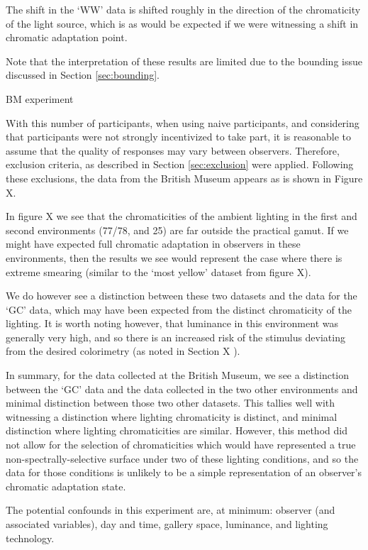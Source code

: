 The shift in the `WW' data is shifted roughly in the direction of the chromaticity of the light source, which is as would be expected if we were witnessing a shift in chromatic adaptation point.

Note that the interpretation of these results are limited due to the bounding issue discussed in Section \ref{sec:bounding}.

BM experiment


With this number of participants, when using naive participants, and considering that participants were not strongly incentivized to take part, it is reasonable to assume that the quality of responses may vary between observers. Therefore, exclusion criteria, as described in Section \ref{sec:exclusion} were applied. Following these exclusions, the data from the British Museum appears as is shown in Figure X. 

In figure X we see that the chromaticities of the ambient lighting in the first and second environments (77/78, and 25) are far outside the practical gamut. If we might have expected full chromatic adaptation in observers in these environments, then the results we see would represent the case where there is extreme smearing (similar to the `most yellow' dataset from figure X). 

We do however see a distinction between these two datasets and the data for the `GC' data, which may have been expected from the distinct chromaticity of the lighting. It is worth noting however, that luminance in this environment was generally very high, and so there is an increased risk of the stimulus deviating from the desired colorimetry (as noted in Section X%
).

In summary, for the data collected at the British Museum, we see a distinction between the `GC' data and the data collected in the two other environments and minimal distinction between those two other datasets. This tallies well with witnessing a distinction where lighting chromaticity is distinct, and minimal distinction where lighting chromaticities are similar. However, this method did not allow for the selection of chromaticities which would have represented a true non-spectrally-selective surface under two of these lighting conditions, and so the data for those conditions is unlikely to be a simple representation of an observer's chromatic adaptation state.

The potential confounds in this experiment are, at minimum: observer (and associated variables), day and time, gallery space, luminance, and lighting technology.

